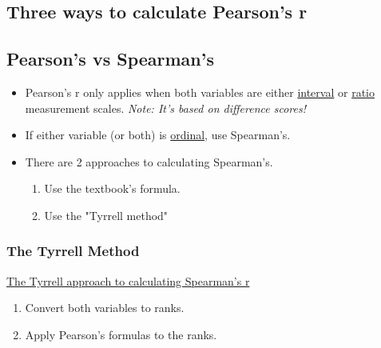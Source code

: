 \documentclass[11pt]{report}
\begin{document}
\subsection{Three ways to calculate Pearson's r}
\subsection{Pearson's vs Spearman's}
\begin{itemize}
    \item Pearson's r only applies when both variables are either \underline{interval} or \underline{ratio} measurement scales. \textit{Note: It's based on difference scores!}
    \item If either variable (or both) is \underline{ordinal}, use Spearman's.
    \item There are 2 approaches to calculating Spearman's. 
    \begin{enumerate}
        \item Use the textbook's formula.
        \item Use the "Tyrrell method"
    \end{enumerate}
\end{itemize}

\subsubsection{The Tyrrell Method}
\underline{The Tyrrell approach to calculating Spearman's r}
\begin{enumerate}
    \item Convert both variables to ranks. 
    \item Apply Pearson's formulas to the ranks. 
\end{enumerate}
\end{document}
